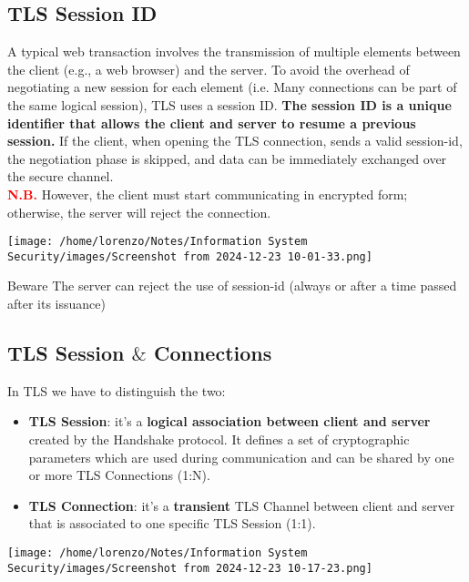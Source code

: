 \subsection{TLS Session ID}
\begin{minipage}{0.6\textwidth}
A typical web transaction involves the transmission of multiple elements between the client
(e.g., a web browser) and the server. To avoid the overhead of negotiating a new session for
each element (i.e. Many connections can be part of the same logical session), TLS uses a session
ID. \textbf{The session ID is a unique identifier that allows the client and server to resume a previous
session.}
If the client, when opening the TLS connection, sends a valid session-id, the negotiation
phase is skipped, and data can be immediately exchanged over the secure channel. \\
\textcolor{red}{\textbf{N.B.}} However, the client must start communicating in encrypted form; otherwise, the server will reject the
connection.
\end{minipage} 
\hspace{0.5cm}
\begin{minipage}{0.4\textwidth}
    \centering
    \texttt{[image: /home/lorenzo/Notes/Information System Security/images/Screenshot from 2024-12-23 10-01-33.png]}
\end{minipage}
\begin{quotebox-red}{Beware}
    The server can reject the use of session-id (always or after a
    time passed after its issuance)
\end{quotebox-red} 

\subsection{TLS Session \textbf{\(\&\)}  Connections}
\begin{minipage}{0.6\textwidth}
In TLS we have to distinguish the two:
\begin{itemize}
    \item \textbf{TLS Session}: it's a \textbf{logical association between client and server} created by the Handshake protocol. It defines a set of cryptographic parameters which are used during communication and can be shared by one or more TLS Connections (1:N).
    \item \textbf{TLS Connection}: it's a \textbf{transient} TLS Channel between client and server that is associated to one specific TLS Session (1:1).
\end{itemize}
\end{minipage} 
\hspace{0.5cm}
\begin{minipage}{0.4\textwidth}
    \centering
    \texttt{[image: /home/lorenzo/Notes/Information System Security/images/Screenshot from 2024-12-23 10-17-23.png]}
\end{minipage}

